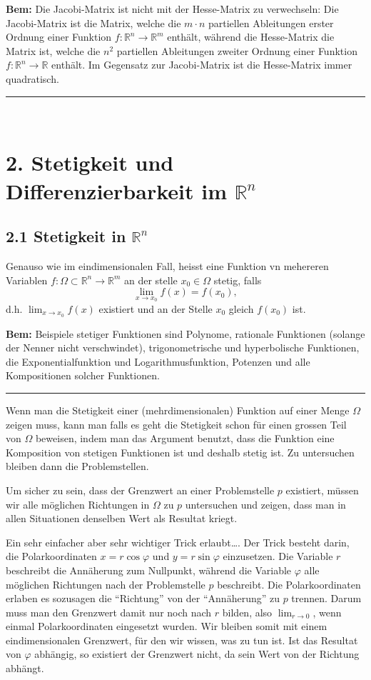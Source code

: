\documentclass[a4paper,landscape,8pt]{extarticle}
\newcommand{\R}{\mathbb{R}}
\newcommand{\sep}{\vspace{5pt}\noindent\hrule\vspace{5pt}}
\newcommand{\Bem}{\textbf{Bem: }}
\renewcommand*{\newpage}{ \ }
\begin{document}
\begin{multicols*}{4}
\Bem Die Jacobi-Matrix ist nicht mit der Hesse-Matrix zu verwechseln: Die
Jacobi-Matrix ist die Matrix, welche die $m\cdot n$ partiellen Ableitungen
erster Ordnung einer Funktion $f\colon \R^n\to\R^m$ enthält, während die
Hesse-Matrix die Matrix ist, welche die $n^2$ partiellen Ableitungen zweiter
Ordnung einer Funktion $f\colon\R^n\to\R$ enthält. Im Gegensatz zur
Jacobi-Matrix ist die Hesse-Matrix immer quadratisch.

\sep

\newpage

\section{2. Stetigkeit und Differenzierbarkeit im $\R^n$}

\subsection{2.1 Stetigkeit in $\R^n$}

Genauso wie im eindimensionalen Fall, heisst eine Funktion vn mehereren
Variablen $f\colon\Omega\subset\R^n\to\R^m$ an der stelle $x_0\in\Omega$ stetig,
falls
\[
\lim_{x\to x_0} f(x) = f(x_0),
\]
d.h. $\lim_{x\to x_0} f(x)$ existiert und an der Stelle $x_0$ gleich $f(x_0)$
ist.

\Bem Beispiele stetiger Funktionen sind Polynome, rationale Funktionen (solange
der Nenner nicht verschwindet), trigonometrische und hyperbolische Funktionen,
die Exponentialfunktion und Logarithmusfunktion, Potenzen und alle Kompositionen
solcher Funktionen.

\sep

\Vorgehen Wenn man die Stetigkeit einer (mehrdimensionalen) Funktion auf einer
Menge $\Omega$ zeigen muss, kann man falls es geht die Stetigkeit schon für
einen grossen Teil von $\Omega$ beweisen, indem man das Argument benutzt, dass
die Funktion eine Komposition von stetigen Funktionen ist und deshalb stetig
ist. Zu untersuchen bleiben dann die Problemstellen.

Um sicher zu sein, dass der Grenzwert an einer Problemstelle $p$ existiert,
müssen wir alle möglichen Richtungen in $\Omega$ zu $p$ untersuchen und zeigen,
dass man in allen Situationen denselben Wert als Resultat kriegt.

Ein sehr einfacher aber sehr wichtiger Trick erlaubt\ldots . Der Trick besteht
darin, die Polarkoordinaten $x=r\cos\varphi$ und $y=r\sin\varphi$ einzusetzen.
Die Variable $r$ beschreibt die Annäherung zum Nullpunkt, während die Variable
$\varphi$ alle möglichen Richtungen nach der Problemstelle $p$ beschreibt. Die
Polarkoordinaten erlaben es sozusagen die ``Richtung'' von der ``Annäherung'' zu
$p$ trennen. Darum muss man den Grenzwert damit nur noch nach $r$ bilden, also
$\lim_{r\to 0}$, wenn einmal Polarkoordinaten eingesetzt wurden. Wir bleiben
somit mit einem eindimensionalen Grenzwert, für den wir wissen, was zu tun ist.
Ist das Resultat von $\varphi$ abhängig, so existiert der Grenzwert nicht, da
sein Wert von der Richtung abhängt.



\end{multicols*}
\end{document}
